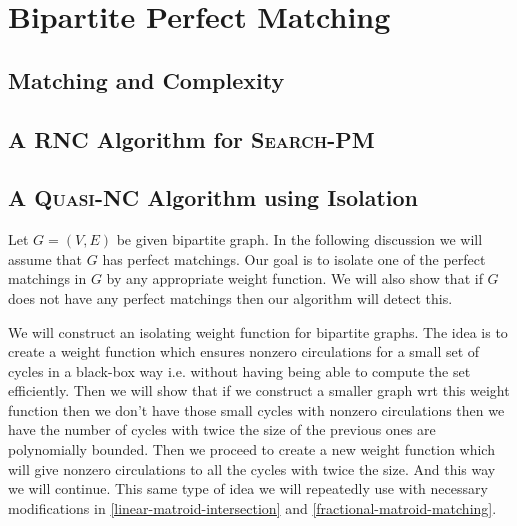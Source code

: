 \chapter{Bipartite Perfect Matching}
\section{Matching and Complexity}
\section{A \textsc{RNC} Algorithm for \textsc{Search-PM}}
\section{A \textsc{Quasi-NC} Algorithm using Isolation}
Let $G=(V,E)$ be given bipartite graph. In the following discussion we will assume that $G$ has perfect matchings. Our goal is to isolate one of the perfect matchings in $G$ by any appropriate weight function. We will also show that if $G$ does not have any perfect matchings then our algorithm will detect this.

We will construct an isolating weight function for bipartite graphs. The idea is to create a weight function which ensures nonzero circulations for a small set of cycles in a black-box way i.e. without having being able to compute the set efficiently. Then we will show that if we construct a smaller graph wrt this weight function then we don't have those small cycles with nonzero circulations then we have the number of cycles with twice the size of the previous ones are polynomially bounded. Then we proceed to create a new weight function which will give nonzero circulations to all the cycles with twice the size. And this way we will continue. This same type of idea we will repeatedly use with necessary modifications in \autoref{linear-matroid-intersection} and \autoref{fractional-matroid-matching}.


